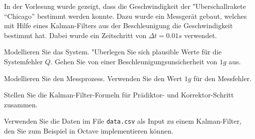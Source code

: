 In der Vorlesung wurde gezeigt, dass die Geschwindigkeit der "Uberschallrakete
``Chicago'' bestimmt werden konnte. Dazu wurde ein Messgerät gebaut,
welches mit Hilfe eines Kalman-Filters aus der Beschleunigung die
Geschwindigkeit bestimmt hat. Dabei wurde ein Zeitschritt von $\Delta t=0.01s$
verwendet.
\begin{teilaufgaben}
\item Modellieren Sie das System.
"Uberlegen Sie sich plausible Werte für die Systemfehler $Q$.
Gehen Sie von einer Beschleunigungsunsicherheit von $1g$
aus.
\item Modellieren Sie den Messprozess. Verwenden Sie den Wert $1g$ für
den Messfehler.
\item Stellen Sie die Kalman-Filter-Formeln für Prädiktor- und
Korrektor-Schritt zusammen.
\item Verwenden Sie die Daten im File {\tt data.csv} als Input zu einem
Kalman-Filter, den Sie zum Beispiel in Octave implementieren können.
\end{teilaufgaben}

